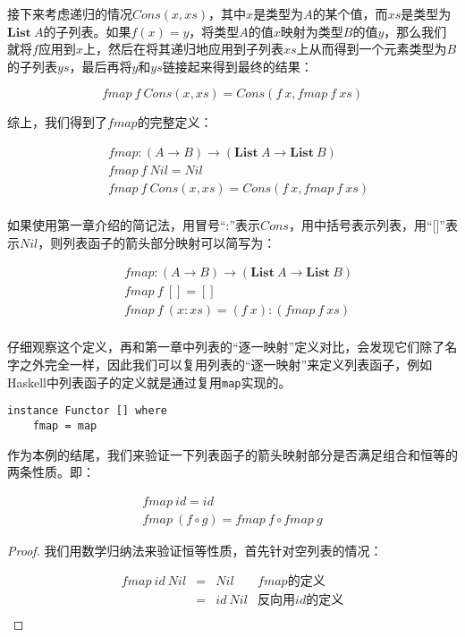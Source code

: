 \documentclass{article}
\begin{document}
\begin{example}
接下来考虑递归的情况$Cons(x, xs)$，其中$x$是类型为$A$的某个值，而$xs$是类型为$\mathbf{List}\ A$的子列表。如果$f(x) = y$，将类型$A$的值$x$映射为类型$B$的值$y$，那么我们就将$f$应用到$x$上，然后在将其递归地应用到子列表$xs$上从而得到一个元素类型为$B$的子列表$ys$，最后再将$y$和$ys$链接起来得到最终的结果：

\[
fmap\ f\ Cons(x, xs) = Cons(f\ x, fmap\ f\ xs)
\]

综上，我们得到了$fmap$的完整定义：

\[
\begin{array}{l}
\quad    fmap : (A \to B) \to (\mathbf{List}\ A \to \mathbf{List}\ B) \\
\quad    fmap\ f\ Nil = Nil \\
\quad    fmap\ f\ Cons(x, xs) = Cons(f\ x, fmap\ f\ xs) \\
\end{array}
\]

如果使用第一章介绍的简记法，用冒号“:”表示$Cons$，用中括号表示列表，用“[]”表示$Nil$，则列表函子的箭头部分映射可以简写为：

\[
\begin{array}{l}
\quad    fmap : (A \to B) \to (\mathbf{List}\ A \to \mathbf{List}\ B) \\
\quad    fmap\ f\ [] = [] \\
\quad    fmap\ f\ (x:xs) = (f\ x):(fmap\ f\ xs) \\
\end{array}
\]

仔细观察这个定义，再和第一章中列表的“逐一映射”定义对比，会发现它们除了名字之外完全一样，因此我们可以复用列表的“逐一映射”来定义列表函子，例如Haskell中列表函子的定义就是通过复用\texttt{map}实现的。

\lstset{frame=single}
\begin{lstlisting}
instance Functor [] where
    fmap = map
\end{lstlisting}

作为本例的结尾，我们来验证一下列表函子的箭头映射部分是否满足组合和恒等的两条性质。即：

\[
\begin{array}{l}
fmap\ id = id \\
fmap\ (f \circ g) = fmap\ f \circ fmap\ g
\end{array}
\]

\begin{proof}
我们用数学归纳法来验证恒等性质，首先针对空列表的情况：

\[
\begin{array}{rcll}
fmap\ id\ Nil & = & Nil & \text{$fmap$的定义} \\
              & = & id\ Nil & \text{反向用$id$的定义} \\
\end{array}
\]


\end{proof}
\end{example}
\end{document}
